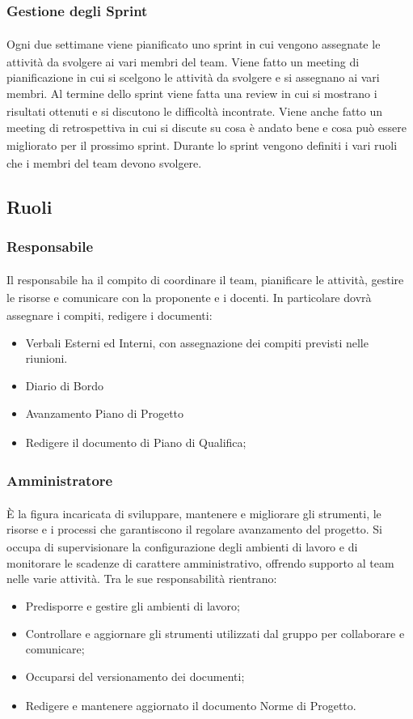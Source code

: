\documentclass[a4paper,11pt]{article}
\newcommand{\G}{\textsubscript{\scalebox{0.6}{\textbf{G}}}}
\begin{document}
\subsubsection{Gestione degli Sprint\G{}}
Ogni due settimane viene pianificato uno sprint\G{} in cui vengono assegnate le attività da svolgere
ai vari membri del team. Viene fatto un meeting di pianificazione in cui si scelgono le attività da svolgere
e si assegnano ai vari membri. Al termine dello sprint\G{} viene fatta una review in cui si mostrano i risultati ottenuti
e si discutono le difficoltà incontrate. Viene anche fatto un meeting di retrospettiva\G{} in cui si discute su 
cosa è andato bene e cosa può essere migliorato per il prossimo sprint\G{}.
Durante lo sprint\G{} vengono definiti i vari ruoli che i membri del team devono svolgere.

\subsection{Ruoli}
\subsubsection{Responsabile\G{}}
Il responsabile\G{} ha il compito di coordinare il team, pianificare le attività,
gestire le risorse e comunicare con la proponente\G{} e i docenti.
In particolare dovrà assegnare i compiti, redigere i documenti:
\begin{itemize}
    \item Verbali Esterni ed Interni, con assegnazione dei compiti previsti nelle riunioni.
    \item Diario di Bordo
    \item Avanzamento Piano di Progetto\G{}
    \item Redigere il documento di Piano di Qualifica\G{};
\end{itemize}
\subsubsection{Amministratore\G{}}
È la figura incaricata di sviluppare, mantenere e migliorare gli strumenti, le 
risorse e i processi che garantiscono il regolare avanzamento del progetto\G{}. Si 
occupa di supervisionare la configurazione degli ambienti di lavoro e di 
monitorare le scadenze di carattere amministrativo, offrendo supporto al team 
nelle varie attività.
Tra le sue responsabilità rientrano:
\begin{itemize}
    \item Predisporre e gestire gli ambienti di lavoro;
    \item Controllare e aggiornare gli strumenti utilizzati dal gruppo per collaborare e comunicare;
    \item Occuparsi del versionamento\G{} dei documenti;
    \item Redigere e mantenere aggiornato il documento Norme di Progetto\G{}.
\end{itemize}
\end{document}
